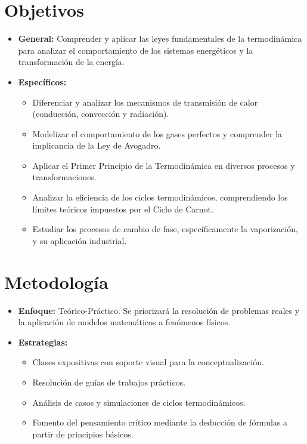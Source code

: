 \section*{Objetivos}
\begin{itemize}[label=\textbullet]
    \item \textbf{General:} Comprender y aplicar las leyes fundamentales de la termodinámica para analizar el comportamiento de los sistemas energéticos y la transformación de la energía.
    \item \textbf{Específicos:}
    \begin{itemize}
        \item Diferenciar y analizar los mecanismos de transmisión de calor (conducción, convección y radiación).
        \item Modelizar el comportamiento de los gases perfectos y comprender la implicancia de la Ley de Avogadro.
        \item Aplicar el Primer Principio de la Termodinámica en diversos procesos y transformaciones.
        \item Analizar la eficiencia de los ciclos termodinámicos, comprendiendo los límites teóricos impuestos por el Ciclo de Carnot.
        \item Estudiar los procesos de cambio de fase, específicamente la vaporización, y su aplicación industrial.
    \end{itemize}
\end{itemize}

\section*{Metodología}
\begin{itemize}[label=\textbullet]
    \item \textbf{Enfoque:} Teórico-Práctico. Se priorizará la resolución de problemas reales y la aplicación de modelos matemáticos a fenómenos físicos.
    \item \textbf{Estrategias:}
    \begin{itemize}
        \item Clases expositivas con soporte visual para la conceptualización.
        \item Resolución de guías de trabajos prácticos.
        \item Análisis de casos y simulaciones de ciclos termodinámicos.
        \item Fomento del pensamiento crítico mediante la deducción de fórmulas a partir de principios básicos.
    \end{itemize}
\end{itemize}

